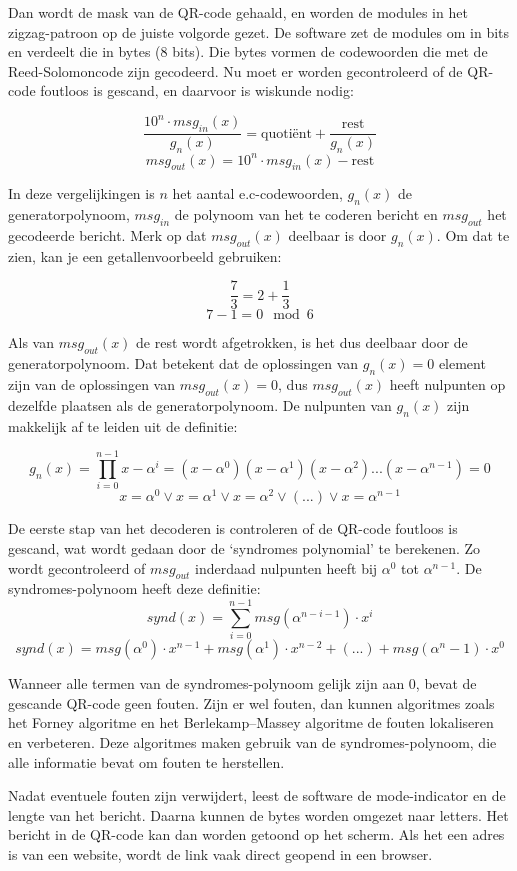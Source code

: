 \documentclass[a4paper]{article}
\begin{document}
Dan wordt de mask van de QR-code gehaald, en worden de modules in het zigzag-patroon op de juiste volgorde gezet. De software zet de modules om in bits en verdeelt die in bytes (8 bits). Die bytes vormen de codewoorden die met de Reed-Solomoncode zijn gecodeerd. Nu moet er worden gecontroleerd of de QR-code foutloos is gescand, en daarvoor is wiskunde nodig:

$$ \frac{10^n \cdot msg_{in}(x)}{g_n(x)}=\text{quotiënt}+\frac{\text{rest}}{g_n(x)}$$
$$ msg_{out}(x) = 10^n \cdot msg_{in}(x) - \text{rest} $$

In deze vergelijkingen is $n$ het aantal e.c-codewoorden, $g_n(x)$ de generatorpolynoom, $msg_{in}$ de polynoom van het te coderen bericht en $msg_{out}$ het gecodeerde bericht. Merk op dat $msg_{out}(x)$ deelbaar is door $g_n(x)$. Om dat te zien, kan je een getallenvoorbeeld gebruiken:

$$ \frac{7}{3} = 2 + \frac{1}{3} $$
$$ 7 - 1 = 0 \mod{6} $$

Als van $msg_{out}(x)$ de rest wordt afgetrokken, is het dus deelbaar door de generatorpolynoom. Dat betekent dat de oplossingen van $g_n(x)=0$ element zijn van de oplossingen van $msg_{out}(x)=0$, dus $msg_{out}(x)$ heeft nulpunten op dezelfde plaatsen als de generatorpolynoom. De nulpunten van $g_n(x)$ zijn makkelijk af te leiden uit de definitie:

$$g_n(x)=\prod\limits_{i=0}^{n-1} x-\alpha^i = (x-\alpha^0)(x-\alpha^1)(x-\alpha^2) ... (x-\alpha^{n-1})=0$$
$$x=\alpha^0 \lor x=\alpha^1 \lor x=\alpha^2 \lor (...) \lor x=\alpha^{n-1}$$

De eerste stap van het decoderen is controleren of de QR-code foutloos is gescand, wat wordt gedaan door de `syndromes polynomial' te berekenen. Zo wordt gecontroleerd of $msg_{out}$ inderdaad nulpunten heeft bij $\alpha^0$ tot $\alpha^{n-1}$. De syndromes-polynoom heeft deze definitie:
$$ synd(x) = \sum\limits_{i=0}^{n-1} msg(\alpha^{n-i-1})\cdot x^{i}$$
$$ synd(x) = msg(\alpha^0)\cdot x^{n-1} + msg(\alpha^1)\cdot x^{n-2} + (...) + msg(\alpha^n-1)\cdot x^{0} $$

Wanneer alle termen van de syndromes-polynoom gelijk zijn aan 0, bevat de gescande QR-code geen fouten. Zijn er wel fouten, dan kunnen algoritmes zoals het Forney algoritme en het Berlekamp–Massey algoritme de fouten lokaliseren en verbeteren. Deze algoritmes maken gebruik van de syndromes-polynoom, die alle informatie bevat om fouten te herstellen.

Nadat eventuele fouten zijn verwijdert, leest de software de mode-indicator en de lengte van het bericht. Daarna kunnen de bytes worden omgezet naar letters. Het bericht in de QR-code kan dan worden getoond op het scherm. Als het een adres is van een website, wordt de link vaak direct geopend in een browser.
\end{document}
